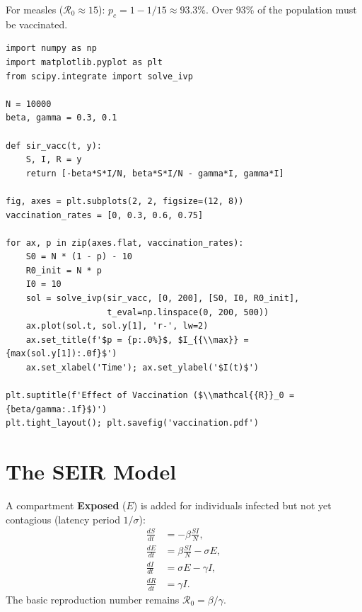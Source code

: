 \begin{example}
For measles ($\mathcal{R}_0\approx 15$):
$p_c = 1 - 1/15 \approx 93.3\%$.
Over 93\% of the population must be vaccinated.
\end{example}

\begin{codeblock}[title=\textbf{Effect of vaccination}]
\begin{verbatim}
import numpy as np
import matplotlib.pyplot as plt
from scipy.integrate import solve_ivp

N = 10000
beta, gamma = 0.3, 0.1

def sir_vacc(t, y):
    S, I, R = y
    return [-beta*S*I/N, beta*S*I/N - gamma*I, gamma*I]

fig, axes = plt.subplots(2, 2, figsize=(12, 8))
vaccination_rates = [0, 0.3, 0.6, 0.75]

for ax, p in zip(axes.flat, vaccination_rates):
    S0 = N * (1 - p) - 10
    R0_init = N * p
    I0 = 10
    sol = solve_ivp(sir_vacc, [0, 200], [S0, I0, R0_init],
                    t_eval=np.linspace(0, 200, 500))
    ax.plot(sol.t, sol.y[1], 'r-', lw=2)
    ax.set_title(f'$p = {p:.0%}$, $I_{{\\max}} = {max(sol.y[1]):.0f}$')
    ax.set_xlabel('Time'); ax.set_ylabel('$I(t)$')

plt.suptitle(f'Effect of Vaccination ($\\mathcal{{R}}_0 = {beta/gamma:.1f}$)')
plt.tight_layout(); plt.savefig('vaccination.pdf')
\end{verbatim}
\end{codeblock}

\section{The SEIR Model}
\label{sec:seir}

\begin{definition}
A compartment \textbf{Exposed} ($E$) is added for individuals
infected but not yet contagious (latency period $1/\sigma$):
\begin{align}
  \frac{dS}{dt} &= -\beta\frac{SI}{N}, \\
  \frac{dE}{dt} &= \beta\frac{SI}{N} - \sigma E, \\
  \frac{dI}{dt} &= \sigma E - \gamma I, \\
  \frac{dR}{dt} &= \gamma I.
\end{align}
The basic reproduction number remains $\mathcal{R}_0 = \beta/\gamma$.
\end{definition}

